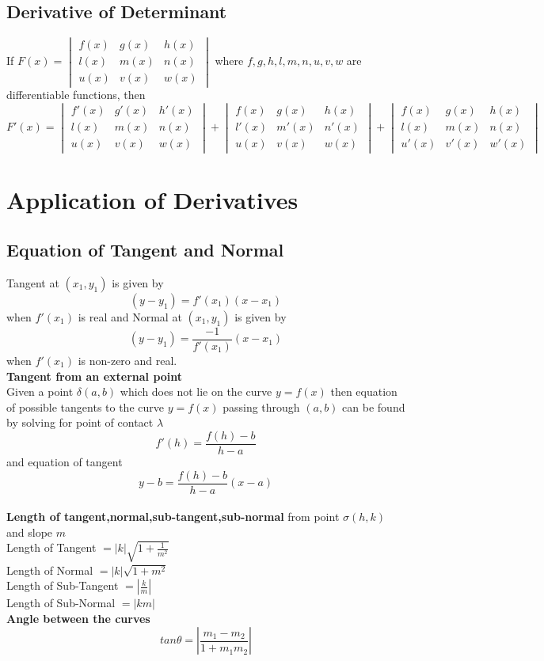 \documentclass[twocolumn, 10pt]{article}
\begin{document}
\subsection{Derivative of Determinant}
If $F(x)= 
\begin{vmatrix}
f(x) & g(x) & h(x)\\
l(x) & m(x) & n(x)\\
u(x) & v(x) & w(x)
\end{vmatrix}$
where $f,g,h,l,m,n,u,v,w$ are differentiable functions, then
$F'(x)= \begin{vmatrix}
f'(x) & g'(x) & h'(x)\\
l(x) & m(x) & n(x)\\
u(x) & v(x) & w(x)
\end{vmatrix} +
\begin{vmatrix}
f(x) & g(x) & h(x)\\
l'(x) & m'(x) & n'(x)\\
u(x) & v(x) & w(x)
\end{vmatrix} +
\begin{vmatrix}
f(x) & g(x) & h(x)\\
l(x) & m(x) & n(x)\\
u'(x) & v'(x) & w'(x)
\end{vmatrix}
$
\section{Application of Derivatives}
\subsection{Equation of Tangent and Normal}
Tangent at $(x_1,y_1)$ is given by $$(y-y_1)=f'(x_1)(x-x_1)$$ when $f'(x_1)$ is real and Normal at $(x_1,y_1)$ is given by $$(y-y_1)=\frac{-1}{f'(x_1)}(x-x_1)$$ when $f'(x_1)$ is non-zero and real.\\
\textbf{Tangent from an external point} \\
Given a point $\delta(a,b)$ which does not lie on the curve $y=f(x)$
then equation of possible tangents to the curve $y=f(x)$ passing through $(a,b)$ can be found by solving for point of contact $\lambda$
$$f'(h)=\frac{f(h)-b}{h-a}$$ 
and equation of tangent $$ y-b=\frac{f(h)-b}{h-a} (x-a) $$ \\
\textbf{Length of tangent,normal,sub-tangent,sub-normal} from point $\sigma(h,k)$ and slope $m$\\
Length of Tangent $=|k|\sqrt{1+ \frac{1}{m^2}}$ \\
Length of Normal  $=|k|\sqrt{1+ m^2}$ \\
Length of Sub-Tangent $=|\frac{k}{m}|$ \\
Length of Sub-Normal $=|km|$ \\
\textbf{Angle between the curves}
$$tan\theta=|\frac{m_1-m_2}{1+m_1m_2}|$$
\end{document}
